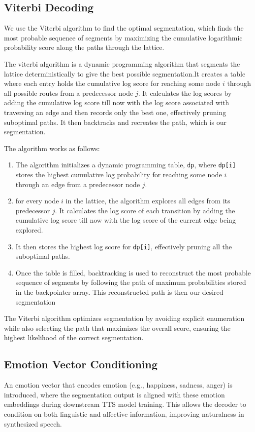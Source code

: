 \documentclass[twoside,11pt]{article}
\begin{document}
\subsection{Viterbi Decoding}
We use the Viterbi algorithm to find the optimal segmentation, which finds the most probable sequence of segments by maximizing the cumulative logarithmic probability score along the paths through the lattice.

The viterbi algorithm is a dynamic programming algorithm that segments the lattice deterministically to give the best possible segmentation.It creates a table where each entry holds the cumulative log score for reaching some node $i$ through all possible routes from a predecessor node $j$. It calculates the log scores by adding the cumulative log score till now with the log score associated with traversing an edge and then records only the best one, effectively pruning suboptimal paths. It then backtracks and recreates the path, which is our segmentation.

The algorithm works as follows:
\begin{enumerate}
    \item The algorithm initializes a dynamic programming table, \texttt{dp}, where \texttt{dp[i]} stores the highest cumulative log probability for reaching some node $i$ through an edge from a predecessor node $j$. 
    \item for every node $i$ in the lattice, the algorithm explores all edges from its predecessor $j$. It calculates the log score of each transition by adding the cumulative log score till now with the log score of the current edge being explored.
    \item It then stores the highest log score for \texttt{dp[i]}, effectively pruning all the suboptimal paths. 
    \item Once the table is filled, backtracking is used to reconstruct the most probable sequence of segments by following the path of maximum probabilities stored in the backpointer array. This reconstructed path is then our desired segmentation
\end{enumerate}

The Viterbi algorithm optimizes segmentation by avoiding explicit enumeration while also selecting the path that maximizes the overall score, ensuring the highest likelihood of the correct segmentation.


\subsection{Emotion Vector Conditioning}
An emotion vector that encodes emotion (e.g., happiness, sadness, anger) is introduced, where the segmentation output is aligned with these emotion embeddings during downstream TTS model training. This allows the decoder to condition on both linguistic and affective information, improving naturalness in synthesized speech.
\end{document}
